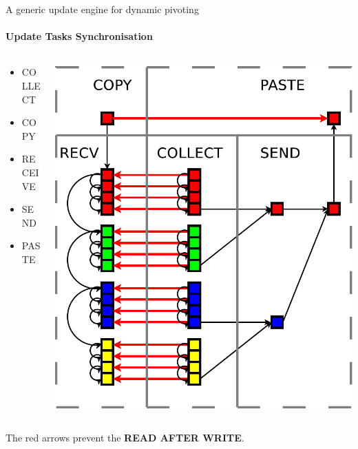 \begin{frame}{A generic update engine for dynamic pivoting}
\framesubtitle{Update Tasks Synchronisation}
\begin{columns}
\begin{column}{.60\textwidth}
\begin{itemize}
\item COLLECT
\item COPY
\item RECEIVE
\item SEND
\item PASTE
\end{itemize}
\end{column}
\hfill
\begin{column}{.40\textwidth}
\begin{center}
\includegraphics[scale=0.3]{swap_opt.pdf}
\end{center}
\end{column}
\end{columns}
The red arrows prevent the \alert{\textbf{READ AFTER WRITE}}.
\end{frame}

